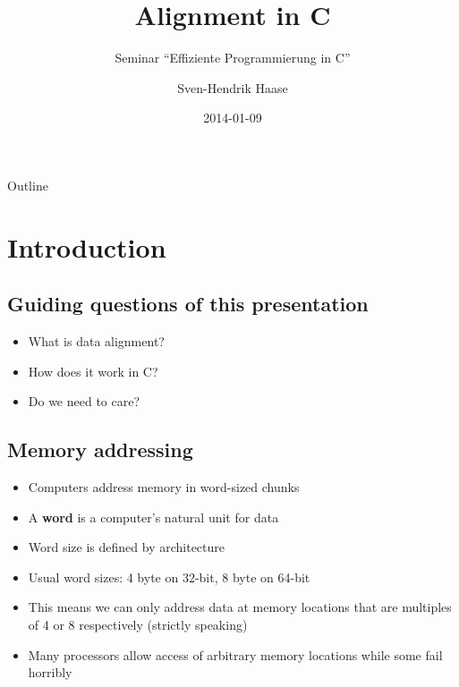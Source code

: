 \documentclass{beamer}
\begin{document}
\title{Alignment in C}
\subtitle{Seminar ``Effiziente Programmierung in C''}
\date{2014-01-09}
\author{Sven-Hendrik Haase}

\begin{frame}
    \titlepage
\end{frame}

\begin{frame}{Outline}
    \tableofcontents
\end{frame}

\section{Introduction}
\subsection{Guiding questions of this presentation}
\begin{frame}{\insertsection}{\insertsubsection}
	\begin{itemize}
		\item What is data alignment?\pause
        \item How does it work in C?\pause
        \item Do we need to care?
	\end{itemize}
\end{frame}

\subsection{Memory addressing}
\begin{frame}{\insertsection}{\insertsubsection}
	\begin{itemize}
		\item Computers address memory in word-sized chunks\pause
		\item A \textbf{word} is a computer's natural unit for data
		\item Word size is defined by architecture
		\item Usual word sizes: 4 byte on 32-bit, 8 byte on 64-bit\pause
		\item This means we can only address data at memory locations that are
			  multiples of 4 or 8 respectively (strictly speaking)
        \item Many processors allow access of arbitrary memory locations while some fail
            horribly
	\end{itemize}
\end{frame}
\end{document}
